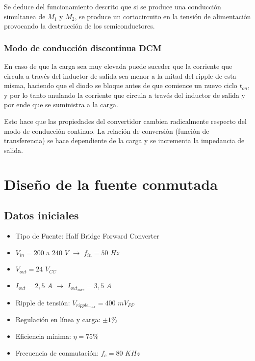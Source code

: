\documentclass[11pt, a4paper]{article}
\begin{document}
Se deduce del funcionamiento descrito que si se produce una conducción simultanea de $M_1$ y $M_2$, se produce un cortocircuito en la tensión de alimentación provocando la destrucción de los semiconductores.

\subsubsection{Modo de conducción discontinua DCM}
En caso de que la carga sea muy elevada puede suceder que la corriente que circula a través del inductor de salida sea menor a la mitad del ripple de esta misma, haciendo que el diodo se bloque antes de que comience un nuevo ciclo $t_{on}$, y por lo tanto anulando la corriente que circula a través del inductor de salida y por ende que se suministra a la carga.

Esto hace que las propiedades del convertidor cambien radicalmente respecto del modo de conducción continuo. La relación de conversión (función de transferencia) se hace dependiente de la carga y se incrementa la impedancia de salida.

\vfill
\section{Diseño de la fuente conmutada}
\subsection{Datos iniciales}
\begin{itemize}
	\item Tipo de Fuente: Half Bridge Forward Converter
	\item $V_{in} = 200$ a $240$ $V$ $\rightarrow$ $f_{in} = 50$ $Hz$
	\item $V_{out} = 24$ $V_{CC}$
	\item $I_{out} = 2,5$ $A$ $\rightarrow$ $I_{out_{max}} = 3,5$ $A$
	\item Ripple de tensión: $V_{ripple_{max}} = 400$ $mV_{PP}$
	\item Regulación en línea y carga: $\pm 1 \%$
	\item Eficiencia mínima: $\eta = 75 \%$
	\item Frecuencia de conmutación: $f_c = 80$ $KHz$
\end{itemize}
\end{document}
